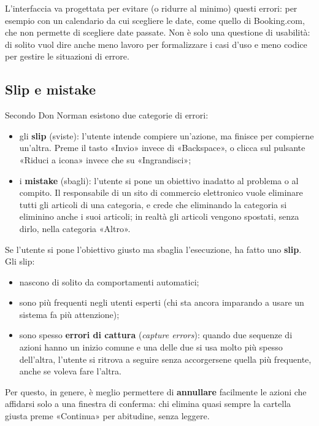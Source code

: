 L'interfaccia va progettata per evitare (o ridurre al minimo) questi errori: per esempio con un calendario da cui
scegliere le date, come quello di Booking.com, che non permette di scegliere date passate. Non è solo una questione di
usabilità: di solito vuol dire anche meno lavoro per formalizzare i casi d'uso e meno codice per gestire le situazioni
di errore.

\subsection{Slip e mistake}

Secondo Don Norman esistono due categorie di errori:

\begin{itemize}
  \item gli \textbf{slip} (sviste): l'utente intende compiere un'azione, ma finisce per compierne un'altra. Preme il
        tasto «Invio» invece di «Backspace», o clicca sul pulsante «Riduci a icona» invece che su «Ingrandisci»;
  \item i \textbf{mistake} (sbagli): l'utente si pone un obiettivo inadatto al problema o al compito. Il responsabile di
        un sito di commercio elettronico vuole eliminare tutti gli articoli di una categoria, e crede che eliminando la
        categoria si eliminino anche i suoi articoli; in realtà gli articoli vengono spostati, senza dirlo, nella
        categoria «Altro».
\end{itemize}

Se l'utente si pone l'obiettivo giusto ma sbaglia l'esecuzione, ha fatto uno \textbf{slip}. Gli slip:

\begin{itemize}
  \item nascono di solito da comportamenti automatici;
  \item sono più frequenti negli utenti esperti (chi sta ancora imparando a usare un sistema fa più attenzione);
  \item sono spesso \textbf{errori di cattura} (\textit{capture errors}): quando due sequenze di azioni hanno un inizio
        comune e una delle due si usa molto più spesso dell'altra, l'utente si ritrova a seguire senza accorgersene
        quella più frequente, anche se voleva fare l'altra.
\end{itemize}

Per questo, in genere, è meglio permettere di \textbf{annullare} facilmente le azioni che affidarsi solo a una finestra
di conferma: chi elimina quasi sempre la cartella giusta preme «Continua» per abitudine, senza leggere.

